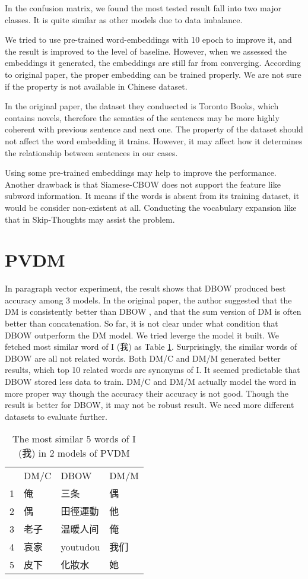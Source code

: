 In the confusion matrix, we found the most tested result fall into two major classes.
It is quite similar as other models due to data imbalance.

We tried to use pre-trained word-embeddings with 10 epoch to improve it, and the result is improved to the level of baseline.
However, when we assessed the embeddings it generated, the embeddings are still far from converging. 
According to original paper, the proper embedding can be trained properly. 
We are not sure if the property is not available in Chinese dataset.

In the original paper, the dataset they conduected is Toronto Books, which contains novels,
 therefore the sematics of the sentences may be more highly coherent with previous sentence and next one. 
The property of the dataset should not affect the word embedding it trains. 
However, it may affect how it determines the relationship between sentences in our cases.

Using some pre-trained embeddings may help to improve the performance. 
Another drawback is that Siamese-CBOW does not support the feature like subword information.
It means if the words is absent from its training dataset, it would be consider non-existent at all. Conducting the vocabulary expansion like that in Skip-Thoughts may assist the problem.


\section{PVDM}

In paragraph vector experiment, the result shows that DBOW produced best accuracy among 3 models. In the original paper, the author suggested that the DM is consistently better than DBOW
, and that the sum version of DM is often better than concatenation. 
So far, it is not clear under what condition that DBOW outperform the DM model. We tried leverge the model it built. 
We fetched most similar word of I (我) as Table \ref{table:doc2vec}. Surprisingly, the similar words of DBOW are all not related words. 
Both DM/C and DM/M generated better results, which top 10 related words are synonyms of I.
It seemed predictable that DBOW stored less data to train. DM/C and DM/M actually model the word in more proper way though the accuracy their accuracy is not good.
Though the result is better for DBOW, it may not be robust result. We need more different datasets to evaluate further.

\begin{table}[]
\centering
\caption{The most similar 5 words of I (我) in 2 models of PVDM}
\label{table:doc2vec}
\begin{tabular}{llll}
      & DM/C & DBOW & DM/M \\
1 & 俺 &  三条  & 偶\\
2 & 偶  & 田徑運動 & 他\\
3 & 老子  & 温暖人间 & 俺\\
4 & 哀家  & youtudou & 我们\\
5 & 皮下  & 化妝水 & 她
\end{tabular}
\end{table}

